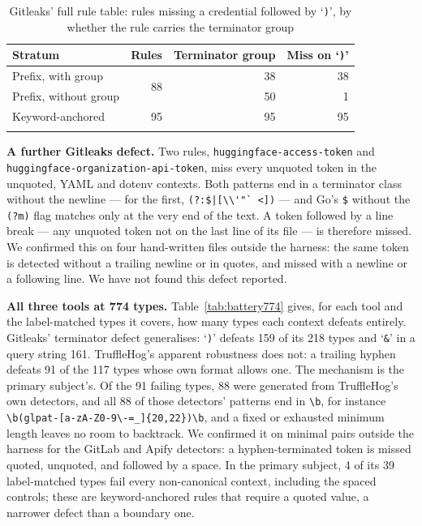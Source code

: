 \documentclass[pdflatex,sn-basic]{sn-jnl}
\begin{document}
\begin{table}[t]
\centering
\caption{Gitleaks' full rule table: rules missing a credential followed by `\texttt{)}', by whether the rule carries the terminator group}
\label{tab:fulltable}
\small
\begin{tabular}{@{}lrrr@{}}
\toprule
Stratum & Rules & Terminator group & Miss on `\texttt{)}' \\
\midrule
Prefix, with group & \multirow{2}{*}{88} & 38 & 38 \\
Prefix, without group & & 50 & 1 \\
Keyword-anchored & 95 & 95 & 95 \\
\botrule
\end{tabular}
\end{table}

\textbf{A further Gitleaks defect.} Two rules, \texttt{huggingface-access-token} and \texttt{huggingface-organization-api-token}, miss every unquoted token in the unquoted, YAML and dotenv contexts. Both patterns end in a terminator class without the newline --- for the first, \verb!(?:$|[\\'"` <])! --- and Go's \verb|$| without the \texttt{(?m)} flag matches only at the very end of the text. A token followed by a line break --- any unquoted token not on the last line of its file --- is therefore missed. We confirmed this on four hand-written files outside the harness: the same token is detected without a trailing newline or in quotes, and missed with a newline or a following line. We have not found this defect reported.

\textbf{All three tools at 774 types.} Table~\ref{tab:battery774} gives, for each tool and the label-matched types it covers, how many types each context defeats entirely. Gitleaks' terminator defect generalises: `\texttt{)}' defeats 159 of its 218 types and `\texttt{\&}' in a query string 161. TruffleHog's apparent robustness does not: a trailing hyphen defeats 91 of the 117 types whose own format allows one. The mechanism is the primary subject's. Of the 91 failing types, 88 were generated from TruffleHog's own detectors, and all 88 of those detectors' patterns end in \verb|\b|, for instance \verb|\b(glpat-[a-zA-Z0-9\-=_]{20,22})\b|, and a fixed or exhausted minimum length leaves no room to backtrack. We confirmed it on minimal pairs outside the harness for the GitLab and Apify detectors: a hyphen-terminated token is missed quoted, unquoted, and followed by a space. In the primary subject, 4 of its 39 label-matched types fail every non-canonical context, including the spaced controls; these are keyword-anchored rules that require a quoted value, a narrower defect than a boundary one.
\end{document}
